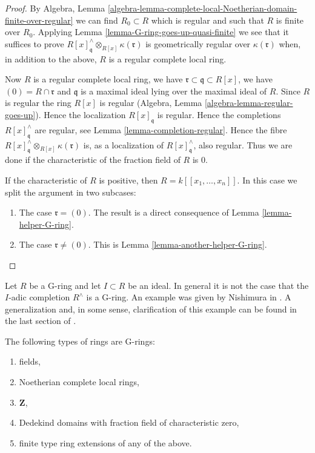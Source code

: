 \begin{proof}
\medskip\noindent
By  Algebra, Lemma
\ref{algebra-lemma-complete-local-Noetherian-domain-finite-over-regular}
we can find $R_0 \subset R$ which is regular and such that $R$ is
finite over $R_0$. Applying Lemma \ref{lemma-G-ring-goes-up-quasi-finite}
we see that it suffices to prove
$R[x]_\mathfrak q^\wedge \otimes_{R[x]} \kappa(\mathfrak r)$
is geometrically regular over $\kappa(\mathfrak r)$ when, in addition to the
above, $R$ is a regular complete local ring.

\medskip\noindent
Now $R$ is a regular complete local ring, we have
$\mathfrak r \subset \mathfrak q \subset R[x]$, we have
$(0) = R \cap \mathfrak r$ and $\mathfrak q$ is a maximal ideal
lying over the maximal ideal of $R$. Since $R$ is regular the
ring $R[x]$ is regular (Algebra, Lemma \ref{algebra-lemma-regular-goes-up}).
Hence the localization $R[x]_\mathfrak q$ is regular.
Hence the completions $R[x]_\mathfrak q^\wedge$ are regular, see
Lemma \ref{lemma-completion-regular}.
Hence the fibre $R[x]_{\mathfrak q}^\wedge \otimes_{R[x]} \kappa(\mathfrak r)$
is, as a localization of $R[x]_\mathfrak q^\wedge$, also regular.
Thus we are done if the characteristic of the fraction field of $R$ is $0$.

\medskip\noindent
If the characteristic of $R$ is positive, then $R = k[[x_1, \ldots, x_n]]$.
In this case we split the argument in two subcases:
\begin{enumerate}
\item The case $\mathfrak r = (0)$. The result is a direct consequence
of Lemma \ref{lemma-helper-G-ring}.
\item The case $\mathfrak r \not = (0)$. This is
Lemma \ref{lemma-another-helper-G-ring}.
\end{enumerate}
\end{proof}

\begin{remark}
\label{remark-G-does-not-survive-completion}
Let $R$ be a G-ring and let $I \subset R$ be an ideal.
In general it is not the case that the $I$-adic completion $R^\wedge$
is a G-ring. An example was given by Nishimura in \cite{Nishimura}.
A generalization and, in some sense, clarification of this example can
be found in the last section of \cite{Dumitrescu}.
\end{remark}

\begin{proposition}
\label{proposition-ubiquity-G-ring}
The following types of rings are G-rings:
\begin{enumerate}
\item fields,
\item Noetherian complete local rings,
\item $\mathbf{Z}$,
\item Dedekind domains with fraction field of characteristic zero,
\item finite type ring extensions of any of the above.
\end{enumerate}
\end{proposition}

